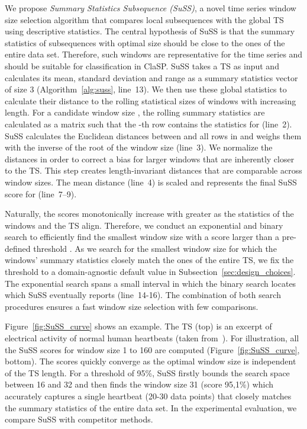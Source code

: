 \documentclass[pdflatex,sn-basic]{sn-jnl}
\begin{document}
We propose \textit{Summary Statistics Subsequence (SuSS)}, a novel time series window size selection algorithm that compares local subsequences with the global TS using descriptive statistics. The central hypothesis of SuSS is that the summary statistics of subsequences with optimal size should be close to the ones of the entire data set. Therefore, such windows are representative for the time series and should be suitable for classification in ClaSP. SuSS takes a TS  as input and calculates its mean, standard deviation and range as a summary statistics vector  of size 3 (Algorithm~\ref{alg:suss}, line~13). We then use these global statistics to calculate their distance to the rolling statistical sizes of windows with increasing length. For a candidate window size , the rolling summary statistics  are calculated as a matrix such that the -th row contains the statistics for  (line~2). SuSS calculates the Euclidean distances between  and all rows in  and weighs them with the inverse of the root of the window size (line~3). We normalize the distances in order to correct a bias for larger windows that are inherently closer to the TS. This step creates length-invariant distances that are comparable across window sizes. The mean distance (line~4) is scaled and represents the final SuSS score for  (line~7--9). 

Naturally, the scores monotonically increase with greater  as the statistics of the windows and the TS align. Therefore, we conduct an exponential and binary search to efficiently find the smallest window size  with a score larger than a pre-defined threshold . As we search for the smallest window size for which the windows' summary statistics closely match the ones of the entire TS, we fix the threshold  to a domain-agnostic default value in Subsection~\ref{sec:design_choices}. The exponential search spans a small interval  in which the binary search locates  which SuSS eventually reports (line~14-16). The combination of both search procedures ensures a fast window size selection with few comparisons. 

Figure~\ref{fig:SuSS_curve} shows an example. The TS (top) is an excerpt of electrical activity of normal human heartbeats (taken from~\citep{UCRClassification}). For illustration, all the SuSS scores for window size 1 to 160 are computed (Figure~\ref{fig:SuSS_curve}, bottom). The scores quickly converge as the optimal window size is independent of the TS length. For a threshold of 95\%, SuSS firstly bounds the search space between 16 and 32 and then finds the window size 31 (score 95,1\%) which accurately captures a single heartbeat (20-30 data points) that closely matches the summary statistics of the entire data set. In the experimental evaluation, we compare SuSS with competitor methods. 
\end{document}
